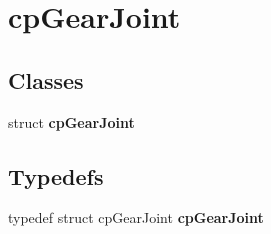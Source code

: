 \hypertarget{group__cp_gear_joint}{\section{cp\-Gear\-Joint}
\label{group__cp_gear_joint}
}
\subsection*{Classes}
\begin{DoxyCompactItemize}
\item 
struct {\bfseries cp\-Gear\-Joint}
\end{DoxyCompactItemize}
\subsection*{Typedefs}
\begin{DoxyCompactItemize}
\item 
\hypertarget{group__cp_gear_joint_ga68c6eff65363907035270c00e96a5b68}{typedef struct cp\-Gear\-Joint {\bfseries cp\-Gear\-Joint}}\label{group__cp_gear_joint_ga68c6eff65363907035270c00e96a5b68}

\end{DoxyCompactItemize}
